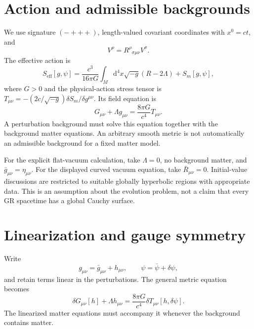 \documentclass[11pt,oneside]{report}
\newcommand{\dd}{\mathrm d}
\theoremstyle{remark}
\numberwithin{definition}{chapter}
\numberwithin{proposition}{chapter}
\numberwithin{remark}{chapter}
\begin{document}
\section{Action and admissible backgrounds}
We use signature $(-+++)$, length-valued covariant coordinates with $x^0=ct$, and
\begin{equation}
[\nabla_\mu,\nabla_\nu]V^\rho=R^\rho{}_{\sigma\mu\nu}V^\sigma.
\end{equation}
The effective action is
\begin{equation}
S_{\mathrm{eff}}[g,\psi]=\frac{c^3}{16\pi G}
\int_M\dd^4x\sqrt{-g}(R-2\Lambda)+S_m[g,\psi],
\label{consistency:eq:SA}
\end{equation}
where $G>0$ and the physical-action stress tensor is
$T_{\mu\nu}=-(2c/\sqrt{-g})\delta S_m/\delta g^{\mu\nu}$. Its field equation is
\begin{equation}
G_{\mu\nu}+\Lambda g_{\mu\nu}=\frac{8\pi G}{c^4}T_{\mu\nu}.
\label{consistency:eq:einstein}
\end{equation}
A perturbation background must solve this equation together with the background matter equations. An arbitrary smooth metric is not automatically an admissible background for a fixed matter model.

For the explicit flat-vacuum calculation, take $\Lambda=0$, no background matter, and $\bar g_{\mu\nu}=\eta_{\mu\nu}$. For the displayed curved vacuum equation, take $\bar R_{\mu\nu}=0$. Initial-value discussions are restricted to suitable globally hyperbolic regions with appropriate data. This is an assumption about the evolution problem, not a claim that every GR spacetime has a global Cauchy surface.

\section{Linearization and gauge symmetry}
Write
\begin{equation}
g_{\mu\nu}=\bar g_{\mu\nu}+h_{\mu\nu},\qquad
\psi=\bar\psi+\delta\psi,
\label{consistency:eq:split}
\end{equation}
and retain terms linear in the perturbations. The general metric equation becomes
\begin{equation}
\delta G_{\mu\nu}[h]+\Lambda h_{\mu\nu}
=\frac{8\pi G}{c^4}\delta T_{\mu\nu}[h,\delta\psi].
\label{consistency:eq:linearizedeinstein}
\end{equation}
The linearized matter equations must accompany it whenever the background contains matter.
\end{document}
